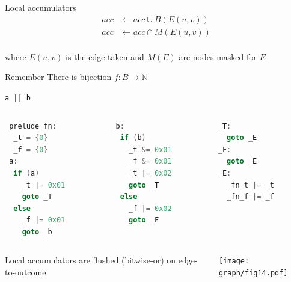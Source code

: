 \documentclass[xcolor = {dvipsnames, table}, aspectratio=169]{beamer}
\begin{document}
\begin{frame}
    \begin{block}{Local accumulators}
        \begin{align*}
            acc & \gets acc \cup B(E(u, v)) \\
            acc & \gets acc \cap M(E(u, v)) \\
        \end{align*}

        where $E(u, v)$ is the edge taken and $M(E)$ are nodes masked for $E$
    \end{block}

    \begin{block}{Remember}
        There is bijection $f: B \rightarrow \mathbb{N}$
    \end{block}
\end{frame}

\begin{frame}[fragile]
    \centering
    \lstinline{a || b}
    \begin{columns}
        \begin{column}{0.3\textwidth}
            \begin{lstlisting}[language=C, basicstyle=\small\ttfamily]
_prelude_fn:
  _t = {0}
  _f = {0}
_a:
  if (a)
    _t |= 0x01
    goto _T
  else
    _f |= 0x01
    goto _b
            \end{lstlisting}
        \end{column}

        \begin{column}{0.3\textwidth}
        \begin{lstlisting}[language=C, basicstyle=\small\ttfamily]
_b:
  if (b)
    _t &= 0x01
    _f &= 0x01
    _t |= 0x02
    goto _T
  else
    _f |= 0x02
    goto _F
        \end{lstlisting}
        \end{column}

        \begin{column}{0.3\textwidth}
            \begin{lstlisting}[language=C, basicstyle=\small\ttfamily]
_T:
  goto _E
_F:
  goto _E
_E:
  _fn_t |= _t
  _fn_f |= _f
        \end{lstlisting}
        \end{column}
    \end{columns}
\end{frame}

\begin{frame}
    \begin{columns}
        \begin{column}{0.5\textwidth}
            Local accumulators are flushed (bitwise-or) on edge-to-outcome
        \end{column}

        \begin{column}{0.5\textwidth}
            \texttt{[image: graph/fig14.pdf]}
        \end{column}
    \end{columns}
\end{frame}
\end{document}
